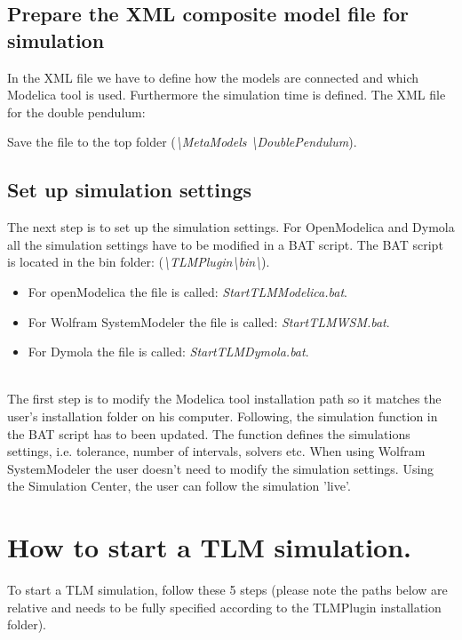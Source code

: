 \subsection{Prepare the XML composite model file for simulation }
In the XML file we have to define how the models are connected and which Modelica tool is used. 
Furthermore the simulation time is defined.
The XML file for the double pendulum: 
~\\

Save the file to the top folder (\textit{\textbackslash MetaModels \textbackslash DoublePendulum}).

\subsection{Set up simulation settings}
The next step is to set up the simulation settings. 
For OpenModelica and Dymola all the simulation settings have to be modified in a BAT script. 
The BAT script is located in the bin folder: (\textit{\textbackslash TLMPlugin\textbackslash bin\textbackslash}).


\begin{itemize}
  \item For openModelica the file is called: \textit{StartTLMModelica.bat}.
  \item For Wolfram SystemModeler the file is called: \textit{StartTLMWSM.bat}.
  \item For Dymola the file is called: \textit{StartTLMDymola.bat}.
\end{itemize}

~\\The first step is to modify the Modelica tool installation path so it matches the user's installation folder on his computer. 
Following, the simulation function in the BAT script has to been updated. 
The function defines the simulations settings, i.e. tolerance, number of intervals, solvers etc. 
When using Wolfram SystemModeler the user doesn't need to modify the simulation settings. 
Using the Simulation Center, the user can follow the simulation 'live'.

\section{How to start a TLM simulation.}

To start a TLM simulation, follow these 5 steps (please note the paths below are relative and needs to be fully specified according to the TLMPlugin installation folder).

